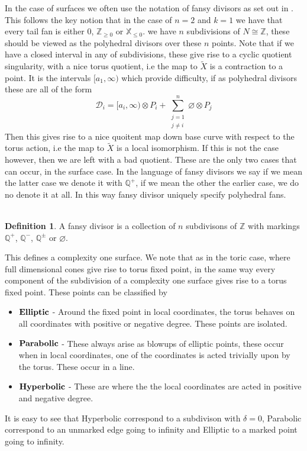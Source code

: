 \documentclass[11pt]{amsart}
\theoremstyle{definition}
\theoremstyle{definition}
\theoremstyle{definition}
\theoremstyle{definition}
\newtheorem{dfn}[thm]{Definition}
\theoremstyle{definition}
\theoremstyle{definition}
\theoremstyle{definition}
\begin{document}
In the case of surfaces we often use the notation of fansy divisors as set out in \cite{Suss}. This follows the key notion that in the case of $n=2$ and $k=1$ we have that every tail fan is either $0$, $\mathbb{Z}_{\geq 0 }$ or $\mathbb{X}_{\leq 0}$.  we have $n$ subdivisions of $N \cong \mathbb{Z}$, these should be viewed as the polyhedral divisors over these $n$ points. Note that if we have a closed interval in any of subdivisions, these give rise to a cyclic quotient singularity, with a nice torus quotient, i.e the map to $\tilde{X}$ is a contraction to a point. It is the intervals $[a_1, \infty )$ which provide difficulty, if as polyhedral divisors these are all of the form 
\[
\mathcal{D}_i = [a_i, \infty) \otimes P_i + \sum_{\substack{j = 1 \\ j \neq i}}^n \varnothing \otimes P_j
\]
Then this gives rise to a nice quoitent map down base curve with respect to the torus action, i.e  the map to $\tilde{X}$ is a local isomorphism. If this is not the case however, then we are left with a bad quotient. These are the only two cases that can occur, in the surface case. In the language of fansy divisors we say if we mean the latter case we denote it with $\mathbb{Q}^+$, if we mean the other the earlier case, we do no denote it at all. In this way fansy divisor uniquely specify polyhedral fans.
\\
\\
\begin{dfn}
A fansy divisor is a collection of $n$ subdivisons of $\mathbb{Z}$ with markings $\mathbb{Q}^+$, $\mathbb{Q}^-$, $\mathbb{Q}^\pm$ or $\varnothing$. 
\end{dfn}
This defines a complexity one surface. We note that as in the toric case, where full dimensional cones give rise to torus fixed point, in the same way every component of the subdivision of a complexity one surface gives rise to a torus fixed point. These points can be classified by 
\begin{itemize}
\item $\bold{Elliptic}$ - Around the fixed point in local coordinates, the torus behaves on all coordinates with positive or negative degree. These points are isolated.
\item $\bold{Parabolic}$ - These always arise as blowups of elliptic points, these occur when in local coordinates, one of the coordinates is acted trivially upon by the torus. These occur in a line.
\item $\bold{Hyperbolic}$ - These are where the the local coordinates are acted in positive and negative degree.
\end{itemize}
It is easy to see that Hyperbolic correspond to a subdivison with $\delta = 0$, Parabolic correspond to an unmarked edge going to infinity and Elliptic to a marked point going to infinity.
\end{document}
